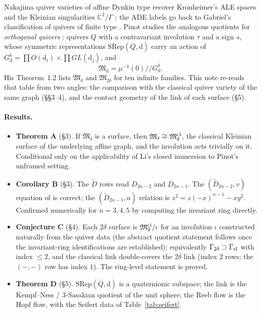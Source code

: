 \documentclass[11pt]{article}
\theoremstyle{definition}
\theoremstyle{remark}
\newcommand{\C}{\mathbb{C}}\newcommand{\R}{\mathbb{R}}\newcommand{\Z}{\mathbb{Z}}
\newcommand{\M}{\mathfrak{M}}\newcommand{\Rep}{\mathrm{Rep}}\newcommand{\SRep}{\mathrm{SRep}}
\begin{document}
Nakajima quiver varieties of affine Dynkin type recover Kronheimer's ALE spaces and the Kleinian singularities $\C^2/\Gamma$ \cite{Kron,Nak94}; the ADE labels go back to Gabriel's classification of quivers of finite type \cite{Gab72}. Pinot studies the analogous quotients for \emph{orthogonal quivers} \cite{Pinot}: quivers $Q$ with a contravariant involution $\tau$ and a sign $s$, whose symmetric representations $\SRep(\overline Q,\mathrm d)$ carry an action of $G^b_{\mathrm d}=\prod O(\mathrm d_i)\times\prod GL(\mathrm d_j)$, and
\[\M_{\mathrm d}=\mu^{-1}(0)/\!/G^b_{\mathrm d}.\]
His Theorem~1.2 lists $\M_\delta$ and $\M_{2\delta}$ for ten infinite families. This note re-reads that table from two angles: the comparison with the classical quiver variety of the same graph (\S\S3--4), and the contact geometry of the link of each surface (\S5).

\paragraph{Results.}
\begin{itemize}[leftmargin=*]
\item \textbf{Theorem A} (\S3). If $\M_\delta$ is a surface, then $\M_\delta\cong\M_\delta^{\rm cl}$, the classical Kleinian surface of the underlying affine graph, and the involution acts trivially on it. Conditional only on the applicability of Li's closed immersion to Pinot's unframed setting.
\item \textbf{Corollary B} (\S3). The $\widetilde D$ rows read $D_{2n-2}$ and $D_{2n-1}$. The $(\widetilde D_{2n-2},v)$ equation of \cite{Pinot} is correct; the $(\widetilde D_{2n-1},a)$ relation is $z^2=z(-x)^{n-1}-xy^2$. Confirmed numerically for $n=3,4,5$ by computing the invariant ring directly.
\item \textbf{Conjecture C} (\S4). Each $2\delta$ surface is $\M^{\rm cl}_\delta/\iota$ for an involution $\iota$ constructed naturally from the quiver data (the abstract quotient statement follows once the invariant-ring identifications are established); equivalently $\Gamma_{2\delta}\supset\Gamma_{\rm cl}$ with index $\le2$, and the classical link double-covers the $2\delta$ link (index $2$ rows; the $(-,-)$ row has index $1$). The ring-level statement is proved.
\item \textbf{Theorem D} (\S5). $\SRep(\overline Q,\mathrm d)$ is a quaternionic subspace; the link is the Kempf--Ness / $3$-Sasakian quotient of the unit sphere; the Reeb flow is the Hopf flow, with the Seifert data of Table~\ref{tab:seifert}.
\end{itemize}
\end{document}
